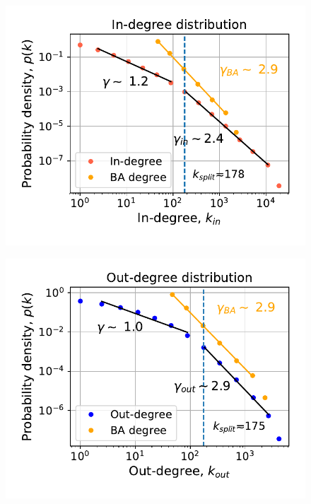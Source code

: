 \documentclass[11pt, twoside]{report}
\begin{document}
\begin{minipage}[b]{0.5\textwidth}
   \centering
    \begin{figure}[H]
      \includegraphics[width=\textwidth]{../../scripts/network_analysis/imgs/in_degree_distribution.pdf}            
          \caption{}
        \label{fig:in_degree}
\end{figure}
\end{minipage}
\begin{minipage}[b]{0.5\textwidth}
  \begin{figure}[H]
  \centering
  \includegraphics[width=\textwidth]{../../scripts/network_analysis/imgs/out_degree_distribution.pdf}            
        \caption{}
\label{fig:out_degree}
\end{figure}
\end{minipage}
\end{document}

